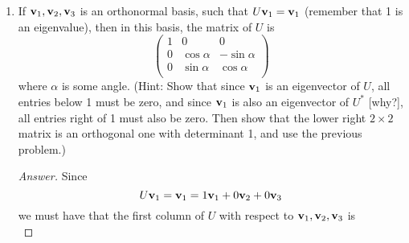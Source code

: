 \documentclass[../psets.tex]{subfiles}
\begin{document}
\begin{enumerate}[label={\textbf{6.\arabic*.}}]
\begin{enumerate}
\begin{proof}[Answer]
\begin{align*}
                |\lambda| &= 1
            \end{align*}
            It follows that
            \begin{align*}
                \lambda_1 &= \e[ix_1]&
                \lambda_2 &= \e[ix_2]&
                \lambda_3 &= \e[ix_3]
            \end{align*}
            We know that if any eigenvalue is complex, its complex conjugate must also be an eigenvalue. Thus, WLOG let $x_2=-x_1$ so
            \begin{align*}
                \lambda_1 &= \e[ix_1]&
                \lambda_2 &= \e[-ix_1]&
                \lambda_3 &= \e[ix_3]
            \end{align*}
            Then
            \begin{equation*}
                1 = \det U = \lambda_1\lambda_2\lambda_3 = \e[ix_1]\e[-ix_1]\e[ix_3] = \e[ix_3] = \lambda_3
            \end{equation*}
            as desired.
        \end{proof}
        \item If $\mathbf{v}_1,\mathbf{v}_2,\mathbf{v}_3$ is an orthonormal basis, such that $U\mathbf{v}_1=\mathbf{v}_1$ (remember that 1 is an eigenvalue), then in this basis, the matrix of $U$ is
        \begin{equation*}
            \begin{pmatrix}
                1 & 0 & 0\\
                0 & \cos\alpha & -\sin\alpha\\
                0 & \sin\alpha & \cos\alpha\\
            \end{pmatrix}
        \end{equation*}
        where $\alpha$ is some angle. (Hint: Show that since $\mathbf{v}_1$ is an eigenvector of $U$, all entries below 1 must be zero, and since $\mathbf{v}_1$ is also an eigenvector of $U^*$ [why?], all entries right of 1 must also be zero. Then show that the lower right $2\times 2$ matrix is an orthogonal one with determinant 1, and use the previous problem.)
        \begin{proof}[Answer]
            Since
            \begin{equation*}
                U\mathbf{v}_1 = \mathbf{v}_1 = 1\mathbf{v}_1+0\mathbf{v}_2+0\mathbf{v}_3
            \end{equation*}
            we must have that the first column of $U$ with respect to $\mathbf{v}_1,\mathbf{v}_2,\mathbf{v}_3$ is
            \begin{equation*}

\end{equation*}
\end{proof}
\end{enumerate}
\end{enumerate}
\end{document}
